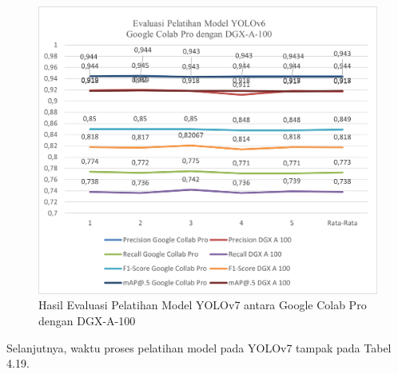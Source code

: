 \begin{figure}[H]
	\vspace{-0.1cm}
	\begin{center}
		\includegraphics[width=1\columnwidth]{bab4/Gambar/Picture26.png}
	\end{center}
	\vspace{-0.2cm}
	\captionsetup{justification=centering}
	\caption{Hasil Evaluasi Pelatihan Model YOLOv7 antara Google Colab Pro dengan DGX-A-100}\label{img:Hasil-Evaluasi-Pelatihan-Model-YOLOv7-Colab-DGX}
\end{figure}

Selanjutnya, waktu proses pelatihan model pada YOLOv7 tampak pada Tabel 4.19.

